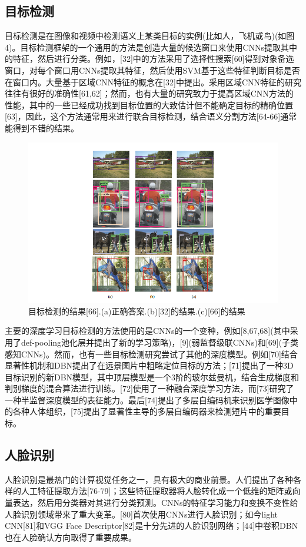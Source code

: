 \documentclass[a4paper]{article}
\begin{document}
\subsection{目标检测}
目标检测是在图像和视频中检测语义上某类目标的实例(比如人，飞机或鸟)(如图4)。目标检测框架的一个通用的方法是创造大量的候选窗口来使用CNNs提取其中的特征，然后进行分类。例如，[32]中的方法采用了选择性搜索[60]得到对象备选窗口，对每个窗口用CNNs提取其特征，然后使用SVM基于这些特征判断目标是否在窗口内。大量基于区域CNN特征的概念在[32]中提出。采用区域CNN特征的研究往往有很好的准确性[61,62]；然而，也有大量的研究致力于提高区域CNN方法的性能，其中的一些已经成功找到目标位置的大致估计但不能确定目标的精确位置[63]，因此，这个方法通常用来进行联合目标检测，结合语义分割方法[64-66]通常能得到不错的结果。


\begin{figure}[ht]
	\centering
	\includegraphics[scale=0.6]{fig4.png}
	\caption{目标检测的结果[66].(a)正确答案.(b)[32]的结果.(c)[66]的结果}
	\label{fig:label}
\end{figure}
主要的深度学习目标检测的方法使用的是CNNs的一个变种，例如[8,67,68](其中采用了def-pooling池化层并提出了新的学习策略)，[9](弱监督级联CNNs)和[69](子类感知CNNs)。然而，也有一些目标检测研究尝试了其他的深度模型。例如[70]结合显著性机制和DBN提出了在远景图片中粗略定位目标的方法；[71]提出了一种3D目标识别的新DBN模型，其中顶层模型是一个3阶的玻尔兹曼机，结合生成梯度和判别梯度的混合算法进行训练。[72]使用了一种融合深度学习方法，而[73]研究了一种半监督深度模型的表征能力。最后[74]提出了多层自编码机来识别医学图像中的各种人体组织，[75]提出了显著性主导的多层自编码器来检测短片中的重要目标。
\subsection{人脸识别}
人脸识别是最热门的计算视觉任务之一，具有极大的商业前景。人们提出了各种各样的人工特征提取方法[76-79]；这些特征提取器将人脸转化成一个低维的矩阵或向量表达，然后用分类器对其进行分类预测。CNNs的特征学习能力和变换不变性给人脸识别领域带来了重大变革。[80]首次使用CNNs进行人脸识别；如今light CNN[81]和VGG Face Descriptor[82]是十分先进的人脸识别网络；[44]中卷积DBN也在人脸确认方向取得了重要成果。
\end{document}

